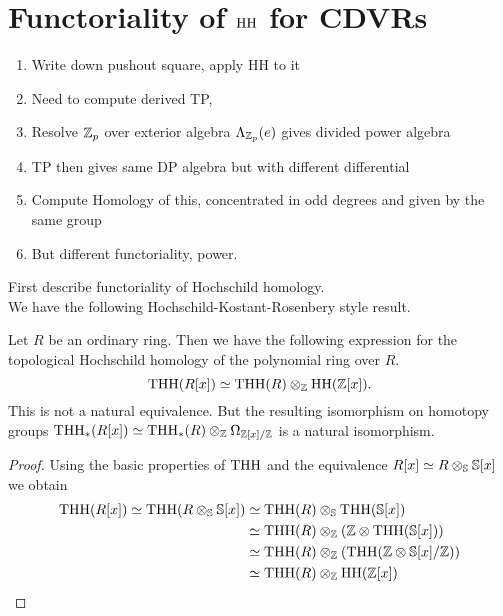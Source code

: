 \section{Functoriality of $\HH$ for CDVRs}
\begin{enumerate}
    \item Write down pushout square, apply HH to it
    \item Need to compute derived TP, 
    \item Resolve $\Z_p$ over exterior algebra $\Lambda_{\Z_p}(e)$ gives divided power algebra
    \item TP then gives same DP algebra but with different differential
    \item Compute Homology of this, concentrated in odd degrees and given by the same group
    \item But different functoriality, power.
\end{enumerate}
First describe functoriality of Hochschild homology.\\
We have the following Hochschild-Kostant-Rosenbery style result.
\begin{lem}
    Let $R$ be an ordinary ring. Then we have the following expression for the topological Hochschild homology of the polynomial ring over $R$.
    \begin{equation*}
        \THH(R[x])\simeq \THH(R)\otimes_\Z \HH(\Z[x]).
    \end{equation*}
    This is not a natural equivalence. But the resulting isomorphism on homotopy groups $\THH_*(R[x])\simeq \THH_*(R)\otimes_\Z \Omega_{\Z[x]/\Z}$ is a natural isomorphism.
\end{lem}
\begin{proof} Using the basic properties of $\THH$ and the equivalence $R[x]\simeq R\otimes_\S \S[x]$ we obtain
    \begin{align*}
        \THH(R[x])\simeq \THH(R\otimes_\S \S[x])&\simeq\THH(R)\otimes_\S \THH(\S[x]) \\
        &\simeq \THH(R)\otimes_\Z (\Z\otimes \THH(\S[x])) \\
        &\simeq\THH(R)\otimes_\Z (\THH(\Z\otimes \S[x]/\Z))\\
        &\simeq 
         \THH(R)\otimes_\Z \HH(\Z[x])
    \end{align*}
\end{proof}
